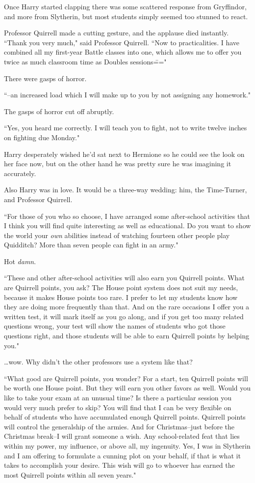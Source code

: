 Once Harry started clapping there was some scattered response from Gryffindor, and more from Slytherin, but most students simply seemed too stunned to react.

Professor Quirrell made a cutting gesture, and the applause died instantly. ``Thank you very much," said Professor Quirrell. ``Now to practicalities. I have combined all my first-year Battle classes into one, which allows me to offer you twice as much classroom time as Doubles sessions\==="

There were gasps of horror.

``\---an increased load which I will make up to you by not assigning any homework."

The gasps of horror cut off abruptly.

``Yes, you heard me correctly. I will teach you to fight, not to write twelve inches on fighting due Monday."

Harry desperately wished he'd sat next to Hermione so he could see the look on her face now, but on the other hand he was pretty sure he was imagining it accurately.

Also Harry was in love. It would be a three-way wedding: him, the Time-Turner, and Professor Quirrell.

``For those of you who so choose, I have arranged some after-school activities that I think you will find quite interesting as well as educational. Do you want to show the world your \emph{own} abilities instead of watching fourteen other people play Quidditch? More than seven people can fight in an army."

Hot \emph{damn}.

``These and other after-school activities will also earn you Quirrell points. What are Quirrell points, you ask? The House point system does not suit my needs, because it makes House points too rare. I prefer to let my students know how they are doing more frequently than that. And on the rare occasions I offer you a written test, it will mark itself as you go along, and if you get too many related questions wrong, your test will show the names of students who got those questions right, and those students will be able to earn Quirrell points by helping you."

{\ldots}wow. Why didn't the other professors use a system like that?

``What good are Quirrell points, you wonder? For a start, ten Quirrell points will be worth one House point. But they will earn you other favors as well. Would you like to take your exam at an unusual time? Is there a particular session you would very much prefer to skip? You will find that I can be very flexible on behalf of students who have accumulated enough Quirrell points. Quirrell points will control the generalship of the armies. And for Christmas\---just before the Christmas break\---I will grant someone a wish. Any school-related feat that lies within my power, my influence, or above all, my ingenuity. Yes, I was in Slytherin and I am offering to formulate a cunning plot on your behalf, if that is what it takes to accomplish your desire. This wish will go to whoever has earned the most Quirrell points within all seven years."

